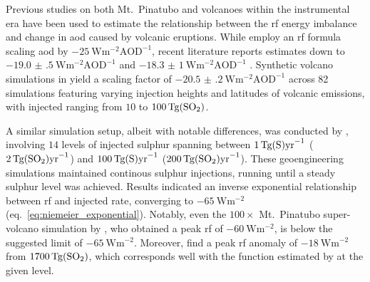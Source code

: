 \documentclass{ametsocV6.1}
\newcommand{\iso}[1][i]{{#1}njected \ce{SO2}}
\begin{document}
Previous studies on both Mt.\ Pinatubo \citep{mills2017,hansen2005} and volcanoes within
the instrumental era \citep{gregory2016} have been used to estimate the relationship
between the \gls{rf} energy imbalance and change in \gls{aod} caused by volcanic
eruptions. While \citet{myhre2013} employ an \gls{rf} formula scaling \gls{aod} by
\(\SI{-25}{\watt\metre^{-2}\mathrm{AOD}^{-1}}\), recent literature reports estimates
down to \(\SI{-19.0(5)}{\watt\metre^{-2}\mathrm{AOD}^{-1}}\) \citep{gregory2016} and
\(\SI{-18.3(10)}{\watt\metre^{-2}\mathrm{AOD}^{-1}}\) \citep{mills2017}. Synthetic
volcano simulations in \citet{marshall2020} yield a scaling factor of
\(\SI{-20.5(2)}{\watt\metre^{-2}\mathrm{AOD}^{-1}}\) across 82 simulations featuring
varying injection heights and latitudes of volcanic emissions, with \iso{} ranging from
\(10\) to \(\SI{100}{\tera\gram(\ce{SO2})}\).

A similar simulation setup, albeit with notable differences, was conducted by
\citet{niemeier2015}, involving \(14\) levels of injected sulphur spanning between
\(\SI{1}{\tera\gram(\ce{S})\mathrm{yr}^{-1}}\)
(\(\SI{2}{\tera\gram(\ce{SO2})\mathrm{yr}^{-1}}\)) and
\(\SI{100}{\tera\gram(\ce{S})\mathrm{yr}^{-1}}\)
(\(\SI{200}{\tera\gram(\ce{SO2})\mathrm{yr}^{-1}}\)). These geoengineering simulations
maintained continous sulphur injections, running until a steady sulphur level was
achieved. Results indicated an inverse exponential relationship between \gls{rf} and
\iso{} rate, converging to \(\SI{-65}{\watt\metre^{-2}}\)
(eq.~\ref{eq:niemeier_exponential}). Notably, even the \(100\times\) Mt.\ Pinatubo
super-volcano simulation by \citet{jones2005}, who obtained a peak \gls{rf} of
\(\SI{-60}{\watt\metre^{-2}}\), is below the suggested limit of
\(\SI{-65}{\watt\metre^{-2}}\). Moreover, \citet{timmreck2010} find a peak \gls{rf}
anomaly of \(\SI{-18}{\watt\metre^{-2}}\) from \(\SI{1700}{\tera\gram(\ce{SO2})}\),
which corresponds well with the function estimated by \citet{niemeier2015} at the given
 level.
\end{document}
